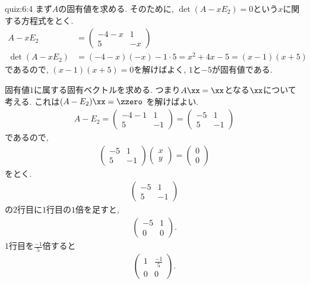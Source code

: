 \begin{answerof}{quiz:6:4}
  まず$A$の固有値を求める.
  そのために, $\det(A-xE_2)=0$という$x$に関する方程式をとく.
  \begin{align*}
    A-xE_2&=\begin{pmatrix}-4-x&1\\5&-x\end{pmatrix}\\
    \det(A-xE_2)&=(-4-x)(-x)-1\cdot 5=x^2+4x-5=(x-1)(x+5)
  \end{align*}
  であるので, $(x-1)(x+5)=0$を解けばよく,
  $1$と$-5$が固有値である.

  固有値$1$に属する固有ベクトルを求める.
  つまり$A\xx=\xx$となる$\xx$について考える.
  これは$(A-E_2)\xx=\zzero$
  を解けばよい.
  \begin{align*}
    A-E_2=\begin{pmatrix}-4-1&1\\5&-1\end{pmatrix}
    =\begin{pmatrix}-5&1\\5&-1\end{pmatrix}
  \end{align*}
  であるので,
  \begin{align*}
    \begin{pmatrix}-5&1\\5&-1\end{pmatrix}
    \begin{pmatrix}x\\y\end{pmatrix}=
    \begin{pmatrix}0\\0\end{pmatrix}
  \end{align*}
  をとく.
  \begin{align*}
    \begin{pmatrix}-5&1\\5&-1\end{pmatrix}
  \end{align*}
  の$2$行目に$1$行目の$1$倍を足すと,
 \begin{align*}
    \begin{pmatrix}-5&1\\0&0\end{pmatrix}.
  \end{align*}
 $1$行目を$\frac{-1}{5}$倍すると
 \begin{align*}
    \begin{pmatrix}1&\frac{-1}{5}\\0&0\end{pmatrix}.

\end{align*}
\end{answerof}

